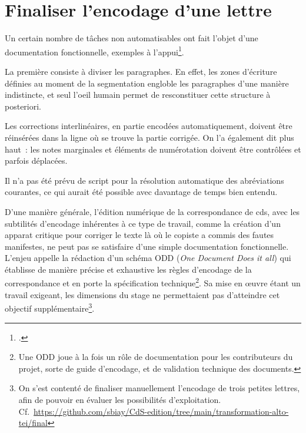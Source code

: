 \documentclass[a4paper,12pt,twoside]{book}
\begin{document}
		\section{Finaliser l'encodage d'une lettre}
		
			Un certain nombre de tâches non automatisables ont fait l'objet d'une documentation fonctionnelle, exemples à l'appui\footcite{biayFinaliserEncodageLettre2022}.
			
			La première consiste à diviser les paragraphes. En effet, les zones d'écriture définies au moment de la \gls{segmentation} engloble les paragraphes d'une manière indistincte, et seul l'oeil humain permet de resconstituer cette structure à posteriori.
			
			Les corrections interlinéaires, en partie encodées automatiquement, doivent être réinsérées dans la ligne où se trouve la partie corrigée. On l'a également dit plus haut~: les notes marginales et éléments de numérotation doivent être contrôlées et parfois déplacées.
			
			Il n'a pas été prévu de script pour la résolution automatique des abréviations courantes, ce qui aurait été possible avec davantage de temps bien entendu. 
			
			D'une manière générale, l'édition numérique de la correspondance de \gls{cds}, avec les subtilités d'encodage inhérentes à ce type de travail, comme la création d'un apparat critique pour corriger le texte là où le copiste a commis des fautes manifestes, ne peut pas se satisfaire d'une simple documentation fonctionnelle. L'enjeu appelle la rédaction d'un schéma ODD (\textit{One Document Does it all}) qui établisse de manière précise et exhaustive les règles d'encodage de la correspondance et en porte la spécification technique\footnote{Une ODD joue à la fois un rôle de documentation pour les contributeurs du projet, sorte de guide d'encodage, et de validation technique des documents.}. Sa mise en œuvre étant un travail exigeant, les dimensions du stage ne permettaient pas d'atteindre cet objectif supplémentaire\footnote{On s'est contenté de finaliser manuellement l'encodage de trois petites lettres, afin de pouvoir en évaluer les possibilités d'exploitation. Cf.~\url{https://github.com/sbiay/CdS-edition/tree/main/transformation-alto-tei/final}}.
			
				
	\appendix
	
	\renewcommand{\appendixpagename}{Annexes}
	
	\renewcommand{\appendixtocname}{Annexes}
	
\end{document}
